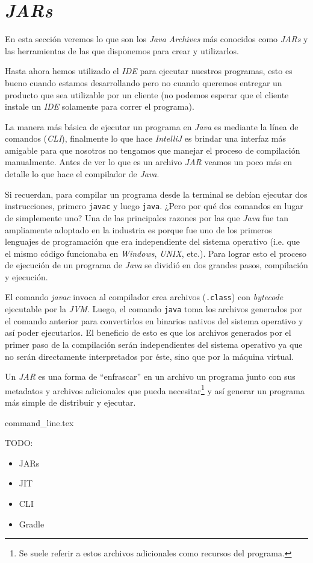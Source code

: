 \section{\textit{JARs}}
  En esta sección veremos lo que son los \textit{Java Archives} más conocidos como 
  \textit{JARs} y las herramientas de las que disponemos para crear y utilizarlos.

  Hasta ahora hemos utilizado el \textit{IDE} para ejecutar nuestros programas, esto es bueno cuando
  estamos desarrollando pero no cuando queremos entregar un producto que sea utilizable por un 
  cliente (no podemos esperar que el cliente instale un \textit{IDE} solamente para correr el 
  programa).

  La manera más básica de ejecutar un programa en \textit{Java} es mediante la línea de comandos 
  (\textit{CLI}), finalmente lo que hace \textit{IntelliJ} es brindar una interfaz más amigable para
  que nosotros no tengamos que manejar el proceso de compilación manualmente.
  Antes de ver lo que es un archivo \textit{JAR} veamos un poco más en detalle lo que hace el 
  compilador de \textit{Java}.

  Si recuerdan, para compilar un programa desde la terminal se debían ejecutar dos instrucciones,
  primero \texttt{javac} y luego \texttt{java}.
  ¿Pero por qué dos comandos en lugar de simplemente uno?
  Una de las principales razones por las que \textit{Java} fue tan ampliamente adoptado en la 
  industria es porque fue uno de los primeros lenguajes de programación que era independiente del
  sistema operativo (i.e. que el mismo código funcionaba en \textit{Windows}, \textit{UNIX}, etc.).
  Para lograr esto el proceso de ejecución de un programa de \textit{Java} se dividió en dos grandes
  pasos, compilación y ejecución.

  El comando \textit{javac} invoca al compilador crea archivos (\texttt{.class}) con 
  \textit{bytecode} ejecutable por la \textit{JVM}.
  Luego, el comando \texttt{java} toma los archivos generados por el comando anterior para 
  convertirlos en binarios nativos del sistema operativo y así poder ejecutarlos.
  El beneficio de esto es que los archivos generados por el primer paso de la compilación serán 
  independientes del sistema operativo ya que no serán directamente interpretados por éste, sino que
  por la máquina virtual.

  Un \textit{JAR} es una forma de \enquote{enfrascar} en un archivo un programa junto con sus 
  metadatos y archivos adicionales que pueda necesitar\footnote{Se suele referir a estos archivos 
  adicionales como recursos del programa.} y así generar un programa más simple de distribuir y 
  ejecutar.

  {command_line.tex}

  TODO:
  \begin{itemize}
    \item JARs
    \item JIT
    \item CLI
    \item Gradle
  \end{itemize}